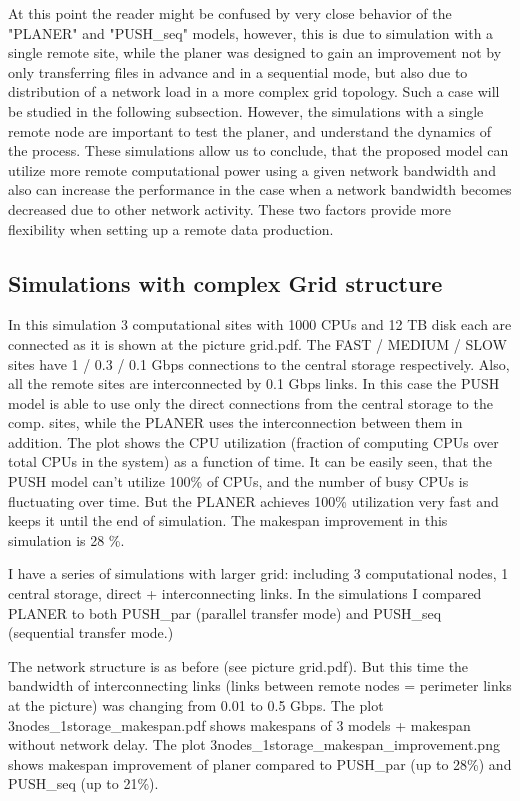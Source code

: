 \documentclass{svjour3}                     %
\begin{document}

At this point the reader might be confused by very close behavior of the "PLANER" and "PUSH\_seq" models, however, this is due to simulation with a single remote site, while the planer was designed to gain an improvement not by only  transferring files in advance and in a sequential mode, but also due to distribution of a network load in a more complex grid topology. Such a case will be studied in the following subsection. However, the simulations with a single remote node are important to test the planer, and understand the dynamics of the process. These simulations allow us to conclude, that the proposed model can utilize more remote computational power using a given network bandwidth and also can increase the performance in the case when a network bandwidth becomes decreased due to other network activity. These two factors provide more flexibility when setting up a remote data production.


\subsection{Simulations with complex Grid structure}

In this simulation 3 computational sites with 1000 CPUs and 12 TB disk each are connected as it is shown at the picture 
grid.pdf. The FAST / MEDIUM / SLOW sites have 1 / 0.3 / 0.1 Gbps connections to the central storage respectively. Also, all the remote sites are interconnected by 0.1 Gbps links. In this case the PUSH model is able to use only the direct connections from the central storage to the comp. sites, while the PLANER uses the interconnection between them in addition. The plot shows the CPU utilization (fraction of computing CPUs over total CPUs in the system) as a function of time. It can be easily seen, that the PUSH model can't utilize 100\% of CPUs, and the number of busy CPUs is fluctuating over time. But the PLANER achieves 100\% utilization very fast and keeps it until the end of simulation. The makespan improvement in this simulation is 28 \%.


I have a series of simulations with larger grid: including 3 computational nodes, 1 central storage, direct + interconnecting links. In the simulations I compared PLANER to both PUSH\_par (parallel transfer mode) and PUSH\_seq (sequential transfer mode.)

The network structure is as before (see picture grid.pdf). But this time the bandwidth of interconnecting links (links between remote nodes = perimeter links at the picture) was changing from 0.01 to 0.5 Gbps. 
The plot 3nodes\_1storage\_makespan.pdf shows makespans of 3 models + makespan without network delay.
The plot 3nodes\_1storage\_makespan\_improvement.png shows makespan improvement of planer compared to PUSH\_par (up to 28\%) and PUSH\_seq (up to 21\%).
\end{document}
